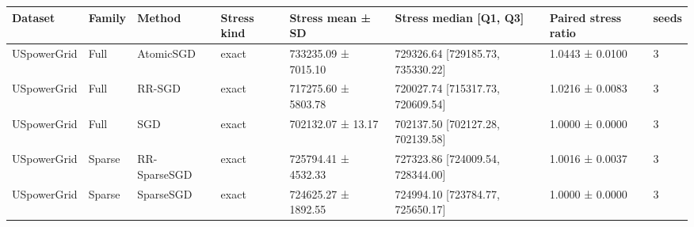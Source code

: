 \begin{tabular}{llllllll}
\hline
Dataset & Family & Method & Stress kind & Stress mean ± SD & Stress median [Q1, Q3] & Paired stress ratio & seeds \\
\hline
USpowerGrid & Full & AtomicSGD & exact & 733235.09 ± 7015.10 & 729326.64 [729185.73, 735330.22] & 1.0443 ± 0.0100 & 3 \\
USpowerGrid & Full & RR-SGD & exact & 717275.60 ± 5803.78 & 720027.74 [715317.73, 720609.54] & 1.0216 ± 0.0083 & 3 \\
USpowerGrid & Full & SGD & exact & 702132.07 ± 13.17 & 702137.50 [702127.28, 702139.58] & 1.0000 ± 0.0000 & 3 \\
USpowerGrid & Sparse & RR-SparseSGD & exact & 725794.41 ± 4532.33 & 727323.86 [724009.54, 728344.00] & 1.0016 ± 0.0037 & 3 \\
USpowerGrid & Sparse & SparseSGD & exact & 724625.27 ± 1892.55 & 724994.10 [723784.77, 725650.17] & 1.0000 ± 0.0000 & 3 \\
\hline
\end{tabular}
